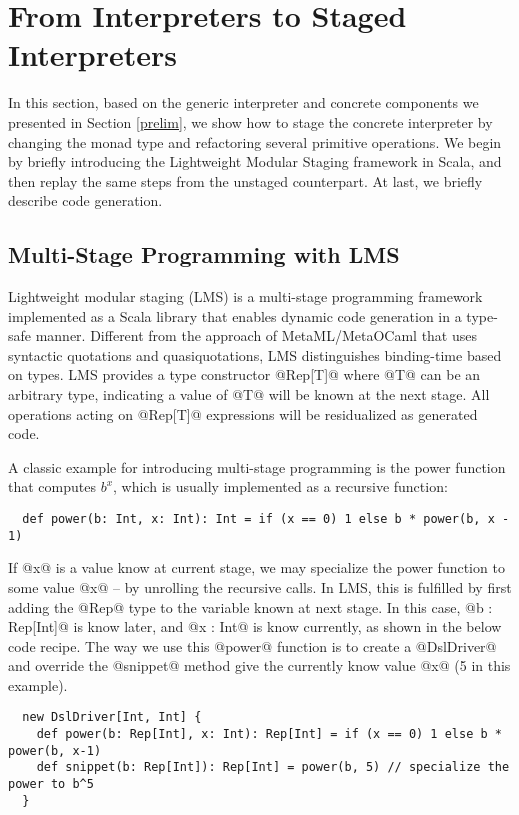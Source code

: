 \section{From Interpreters to Staged Interpreters} \label{stagedinterp}

In this section, based on the generic interpreter and concrete components we
presented in Section \ref{prelim}, we show how to stage the concrete interpreter
by changing the monad type and refactoring several primitive operations. We
begin by briefly introducing the Lightweight Modular Staging framework in Scala,
and then replay the same steps from the unstaged counterpart. At last, we briefly
describe code generation.

\subsection{Multi-Stage Programming with LMS}

Lightweight modular staging (LMS) \cite{DBLP:conf/gpce/RompfO10} is a
multi-stage programming framework implemented as a Scala library that enables
dynamic code generation in a type-safe manner. Different from the approach of
MetaML/MetaOCaml \cite{DBLP:conf/flops/Kiselyov14, DBLP:conf/gpce/CalcagnoTHL03} that
uses syntactic quotations and quasiquotations, LMS distinguishes binding-time
based on types. LMS provides a type constructor @Rep[T]@ where @T@ can be
an arbitrary type, indicating a value of @T@ will be known at the next stage.
All operations acting on @Rep[T]@ expressions will be residualized as generated
code.

A classic example for introducing multi-stage programming is the power function
that computes $b^x$, which is usually implemented as a recursive function:
\begin{lstlisting}
  def power(b: Int, x: Int): Int = if (x == 0) 1 else b * power(b, x - 1)
\end{lstlisting}

If @x@ is a value know at current stage, we may specialize the power function to
some value @x@ -- by unrolling the recursive calls. In LMS, this is fulfilled by
first adding the @Rep@ type to the variable known at next stage. In this case,
@b : Rep[Int]@ is know later, and @x : Int@ is know currently, as shown in the
below code recipe.
The way we use this @power@ function is to create a @DslDriver@ and override the
@snippet@ method give the currently know value @x@ (5 in this example).
\begin{lstlisting}
  new DslDriver[Int, Int] {
    def power(b: Rep[Int], x: Int): Rep[Int] = if (x == 0) 1 else b * power(b, x-1)
    def snippet(b: Rep[Int]): Rep[Int] = power(b, 5) // specialize the power to b^5
  }
\end{lstlisting}

